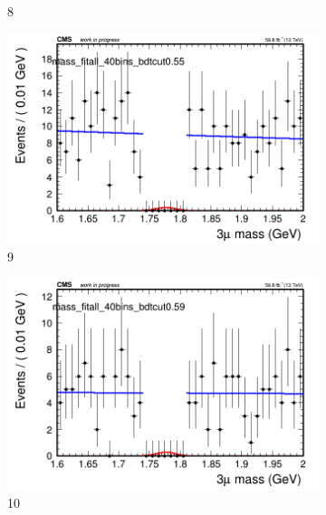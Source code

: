 \begin{figure}[h!]
\begin{subfigure}{0.2\textwidth}
        \caption{8}
    \end{subfigure}
    \begin{subfigure}{0.2\textwidth}
        \includegraphics[width=\textwidth]{unfixed_exp/plots/all/massfit_all_40bins_bdtcut0.55.png}
        \caption{9}
    \end{subfigure}
    \begin{subfigure}{0.2\textwidth}
        \includegraphics[width=\textwidth]{unfixed_exp/plots/all/massfit_all_40bins_bdtcut0.59.png}
        \caption{10}
    \end{subfigure}
    \begin{subfigure}{0.2\textwidth}

\end{subfigure}
\end{figure}
